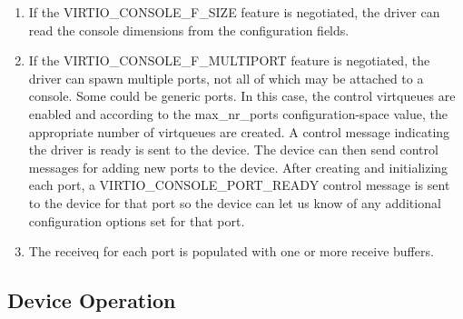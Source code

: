 \begin{enumerate}
\item If the VIRTIO_CONSOLE_F_SIZE feature is negotiated, the driver
  can read the console dimensions from the configuration fields.

\item If the VIRTIO_CONSOLE_F_MULTIPORT feature is negotiated, the
  driver can spawn multiple ports, not all of which may be
  attached to a console. Some could be generic ports. In this
  case, the control virtqueues are enabled and according to the
  max_nr_ports configuration-space value, the appropriate number
  of virtqueues are created. A control message indicating the
  driver is ready is sent to the device. The device can then send
  control messages for adding new ports to the device. After
  creating and initializing each port, a
  VIRTIO_CONSOLE_PORT_READY control message is sent to the device
  for that port so the device can let us know of any additional
  configuration options set for that port.

\item The receiveq for each port is populated with one or more
  receive buffers.
\end{enumerate}

\subsection{Device Operation}\label{sec:Device Types / Console Device / Device Operation}

